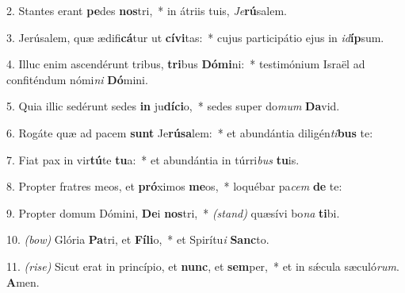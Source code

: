 2. Stantes erant \textbf{pe}des \textbf{nos}tri,~* in átriis tuis, \textit{Je}\textbf{rú}salem.

3. Jerúsalem, quæ ædifi\textbf{cá}tur ut \textbf{cí}\textbf{vi}tas:~* cujus participátio ejus in \textit{id}\textbf{íp}sum.

4. Illuc enim ascendérunt tribus, \textbf{tri}bus \textbf{Dó}\textbf{mi}ni:~* testimónium Israël ad confiténdum nómi\textit{ni} \textbf{Dó}mini.

5. Quia illic sedérunt sedes \textbf{in} ju\textbf{dí}\textbf{ci}o,~* sedes super do\textit{mum} \textbf{Da}vid.

6. Rogáte quæ ad pacem \textbf{sunt} Je\textbf{rú}\textbf{sa}lem:~* et abundántia diligén\textit{ti}\textbf{bus} te:

7. Fiat pax in vir\textbf{tú}te \textbf{tu}a:~* et abundántia in túrri\textit{bus} \textbf{tu}is.

8. Propter fratres meos, et \textbf{pró}ximos \textbf{me}os,~* loquébar pa\textit{cem} \textbf{de} te:

9. Propter domum Dómini, \textbf{De}i \textbf{nos}tri,~* {\color{red}\textit{(stand)}} quæsívi bo\textit{na} \textbf{ti}bi.

10. {\color{red}\textit{(bow)}} Glória \textbf{Pa}tri, et \textbf{Fí}\textbf{li}o,~* et Spirítu\textit{i} \textbf{Sanc}to.

11. {\color{red}\textit{(rise)}} Sicut erat in princípio, et \textbf{nunc}, et \textbf{sem}per,~* et in sǽcula sæculó\textit{rum}. \textbf{A}men.